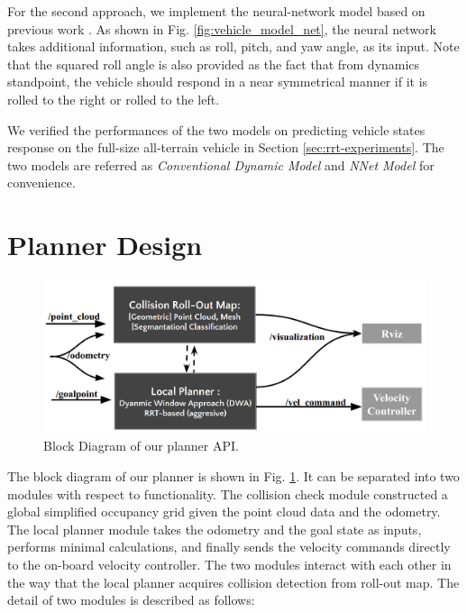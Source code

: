 \documentclass[../thesis.tex]{subfiles}
\begin{document}
For the second approach, we implement the neural-network model based on previous work \cite{bode2007learning}. As shown in Fig. \ref{fig:vehicle_model_net}, the neural network takes additional information, such as roll, pitch, and yaw angle, as its input. Note that the squared roll angle is also provided as the fact that from dynamics standpoint, the vehicle should respond in a near symmetrical manner if it is rolled to the right or rolled to the left. 

We verified the performances of the two models on predicting vehicle states response on the full-size all-terrain vehicle in Section \ref{sec:rrt-experiments}. The two models are referred as \textit{Conventional Dynamic Model} and \textit{NNet Model} for convenience. 


\section{Planner Design} \label{sec:rrt-planner}


\begin{figure}[t]
	\begin{center}
		\centerline{\includegraphics[width=0.8\columnwidth]{./RRTPlanner/fig/planner_module.png}}
		\caption{Block Diagram of our planner API.}
		\label{fig:planner_module}
	\end{center}
\end{figure} 

The block diagram of our planner is shown in Fig. \ref{fig:planner_module}. It can be separated into two modules with respect to functionality. The collision check module constructed a global simplified occupancy grid given the point cloud data and the odometry. The local planner module takes the odometry and the goal state as inputs, performs minimal calculations, and finally sends the velocity commands directly to the on-board velocity controller.
The two modules interact with each other in the way that the local planner acquires collision detection from roll-out map.
The detail of two modules is described as follows:
\end{document}
